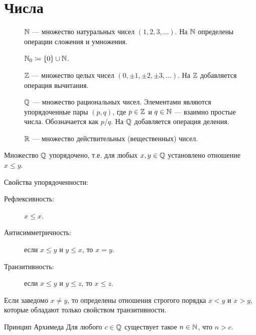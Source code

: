 \section{Числа}

\begin{description}
    \item[] $\mathbb{N}$ --- множество натуральных чисел $(1, 2, 3, \dots)$.
        На $\mathbb{N}$ определены операции сложения и умножения.
    \item[] $\mathbb{N}_0 \coloneqq \{0\} \cup \mathbb{N}$.
    \item[] $\mathbb{Z}$ --- множество целых чисел $(0, \pm 1, \pm 2, \pm 3, \dots)$.
        На $\mathbb{Z}$ добавляется операция вычитания.
    \item[] $\mathbb{Q}$ --- множество рациональных чисел.
        Элементами являются упорядоченные пары $(p, q)$, где $p \in \mathbb{Z}$ и $q \in \mathbb{N}$ --- взаимно простые числа.
        Обозначается как $p/q$. На $\mathbb{Q}$ добавляется операция деления.
    \item[] $\mathbb{R}$ --- множество действительных (вещественных) чисел.
\end{description}

Множество $\mathbb{Q}$ упорядочено, т.е. для любых $x, y \in \mathbb{Q}$ установлено отношение $x \le y$.

Свойства упорядоченности:
\begin{description}
    \item[Рефлексивность:] $x \le x$.
    \item[Антисимметричность:] если $x \le y$ и $y \le x$, то $x = y$.
    \item[Транзитивность:] если $x \le y$ и $y \le z$, то $x \le z$.
\end{description}

Если заведомо $x \neq y$, то определены отношения строгого порядка $x < y$ и $x > y$,
которые обладают только свойством транзитивности.

\begin{theorem}{Принцип Архимеда}{}
    Для любого $c \in \mathbb{Q}$ существует такое $n \in \mathbb{N}$, что $n > c$.
\end{theorem}
